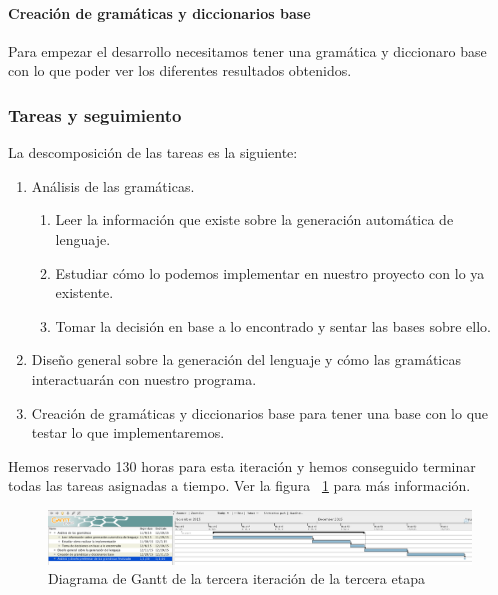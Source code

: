 \paragraph{Creación de gramáticas y diccionarios base} Para empezar el desarrollo necesitamos tener una gramática y diccionaro base con lo que poder ver los diferentes resultados obtenidos.

\subsubsection{Tareas y seguimiento}

La descomposición de las tareas es la siguiente:

\begin{enumerate}[label=\bfseries WBS 3.\arabic*]
  \item Análisis de las gramáticas.
    \begin{enumerate}[label=\bfseries WBS 3.1.\arabic*]
      \item Leer la información que existe sobre la generación automática de lenguaje.
      \item Estudiar cómo lo podemos implementar en nuestro proyecto con lo ya existente.
      \item Tomar la decisión en base a lo encontrado y sentar las bases sobre ello.
    \end{enumerate}
  \item Diseño general sobre la generación del lenguaje y cómo las gramáticas interactuarán con nuestro programa.
  \item Creación de gramáticas y diccionarios base para tener una base con lo que testar lo que implementaremos.
\end{enumerate}

Hemos reservado 130 horas para esta iteración y hemos conseguido terminar todas las tareas asignadas a tiempo. Ver la figura ~\ref{fig:sec3it3} para más información.

\begin{figure}
    \includegraphics[width=\textwidth,height=\textheight,keepaspectratio]{./img/sec3it3.png}
  \caption{Diagrama de Gantt de la tercera iteración de la tercera etapa}
  \label{fig:sec3it3}
\end{figure}

